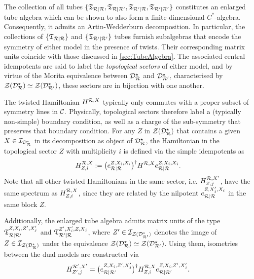 \bigskip\noindent The collection of all tubes $\{\mathfrak{T}_{\mathcal{R}|\mathcal{R}},\mathfrak{T}_{\mathcal{R}|\mathcal{R}'},\mathfrak{T}_{\mathcal{R}'|\mathcal{R}},\mathfrak{T}_{\mathcal{R}'|\mathcal{R}'}\}$ constitutes an enlarged tube algebra which can be shown to also form a finite-dimensional $C^*$-algebra. Consequently, it admits an Artin-Wedderburn decomposition. In particular, the collections of $\{\mathfrak{T}_{\mathcal{R}|\mathcal{R}}\}$ and $\{\mathfrak{T}_{\mathcal{R}'|\mathcal{R}'}\}$ tubes furnish subalgebras that encode the symmetry of either model in the presence of twists. Their corresponding matrix units coincide with those discussed in \cref{sec:TubeAlgebra}. The associated central idempotents are said to label the \emph{topological sectors} of either model, and by virtue of the Morita equivalence between $\mathcal{D}^\star_{\mathcal{R}}$ and $\mathcal{D}^\star_{\mathcal{R}'}$, characterised by $\mathcal{Z}(\mathcal{D}_{\mathcal{R}}^\star)\simeq\mathcal{Z}(\mathcal{D}^\star_{\mathcal{R}'})$, these sectors are in bijection with one another. 

The twisted Hamiltonian $H^{\mathcal{R},X}$ typically only commutes with a proper subset of symmetry lines in $\mathcal{C}$. Physically, topological sectors therefore label a (typically non-simple) boundary condition, as well as a charge of the sub-symmetry that preserves that boundary condition. For any $Z$ in $\mathcal{Z}(\mathcal{D}_{\mathcal{R}}^\star)$ that contains a given $X\in\mathcal{I}_{\mathcal{D}_{\mathcal{R}}^\star}$ in its decomposition as object of $\mathcal{D}_{\mathcal{R}}^\star$, the Hamiltonian in the topological sector $Z$ with multiplicity $i$ is defined via the simple idempotents as
\begin{equation}
	H^{\mathcal{R},X}_{Z,i} := \big( e^{Z,X_i,X_i}_{\mathcal{R}|\mathcal{R}} \big)^\dagger H^{\mathcal{R},X} e^{Z,X_i,X_i}_{\mathcal{R}|\mathcal{R}}.
\end{equation}
Note that all other twisted Hamiltonians in the same sector, i.e. $H^{\mathcal{R}, X'}_{Z,j}$, have the same spectrum as $H^{\mathcal{R},X}_{Z,i}$, since they are related by the nilpotent $e^{Z,X'_j,X_i}_{\mathcal{R}|\mathcal{R}}$ in the same block $Z$.

Additionally, the enlarged tube algebra admits matrix units of the type $\mathfrak{T}^{Z,X_i,Z',X'_j}_{\mathcal{R}|\mathcal{R}'}$ and $\mathfrak{T}^{Z',X'_i,Z,X_j}_{\mathcal{R}'|\mathcal{R}}$, where $Z'\in\mathcal{I}_{\mathcal{Z}(\mathcal{D}_{\mathcal{R}'}^\star)}$ denotes the image of $Z\in\mathcal{I}_{\mathcal{Z}(\mathcal{D}_{\mathcal{R}}^\star)}$ under the equivalence $\mathcal{Z}(\mathcal{D}_{\mathcal{R}}^\star)\simeq\mathcal{Z}(\mathcal{D}_{\mathcal{R}'}^\star)$. Using them, isometries between the dual models are constructed via
\begin{equation}
	H^{\mathcal{R}',X'}_{Z',j} = \big( e^{Z,X_i,Z',X_j'}_{\mathcal{R}|\mathcal{R}'} \big)^\dagger H^{\mathcal{R},X}_{Z,i} e^{Z,X_i,Z',X_j'}_{\mathcal{R}|\mathcal{R}'}.
\end{equation}

